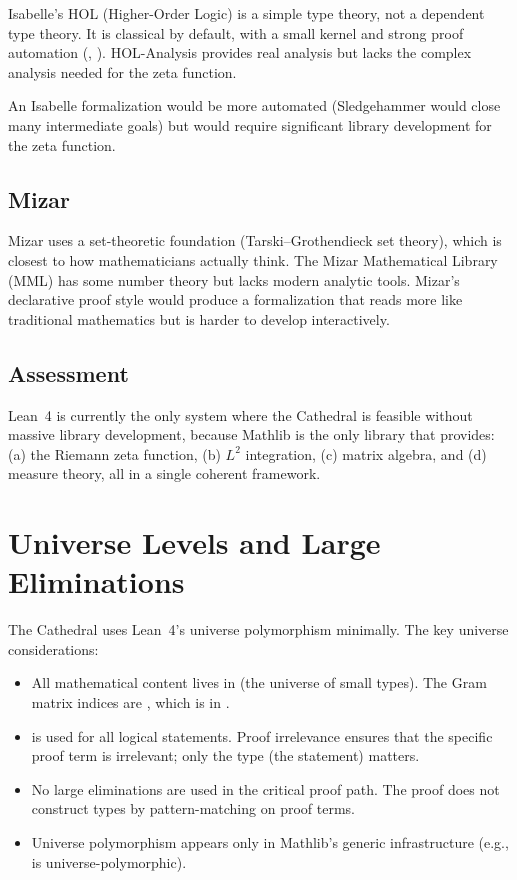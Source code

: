 \documentclass[11pt,a4paper]{article}
\begin{document}
Isabelle's HOL (Higher-Order Logic) is a simple type theory, not a
dependent type theory. It is classical by default, with a small
kernel and strong proof automation (, ).
HOL-Analysis provides real analysis but lacks the complex analysis
needed for the zeta function.

An Isabelle formalization would be more automated (Sledgehammer would
close many intermediate goals) but would require significant library
development for the zeta function.

\subsection{Mizar}

Mizar uses a set-theoretic foundation (Tarski--Grothendieck set theory),
which is closest to how mathematicians actually think. The Mizar
Mathematical Library (MML) has some number theory but lacks modern
analytic tools. Mizar's declarative proof style would produce a
formalization that reads more like traditional mathematics but is
harder to develop interactively.

\subsection{Assessment}

Lean~4 is currently the only system where the Cathedral is feasible
without massive library development, because Mathlib is the only
library that provides: (a) the Riemann zeta function, (b) $L^2$
integration, (c) matrix algebra, and (d) measure theory, all in a
single coherent framework.

\section{Universe Levels and Large Eliminations}
\label{sec:universes}

The Cathedral uses Lean~4's universe polymorphism minimally. The
key universe considerations:

\begin{itemize}
  \item All mathematical content lives in  (the universe
    of small types). The Gram matrix indices are , which
    is in .
  \item {} is used for all logical statements. Proof
    irrelevance ensures that the specific proof term is irrelevant;
    only the type (the statement) matters.
  \item No large eliminations are used in the critical proof path.
    The proof does not construct types by pattern-matching on proof
    terms.
  \item Universe polymorphism appears only in Mathlib's generic
    infrastructure (e.g.,  is universe-polymorphic).
\end{itemize}
\end{document}
